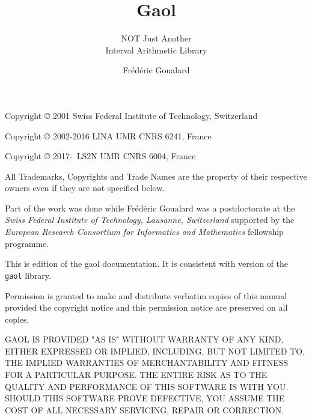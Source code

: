 \documentclass{manual}
\title{Gaol \version}
\subtitle{NOT Just Another \\Interval Arithmetic Library}
\author{Fr\'ed\'eric Goualard}
\institute{Laboratoire d'Informatique de Nantes-Atlantique, France}
\begin{document}
\maketitle

\begin{copyrighttxt}
Copyright \copyright{} 2001 Swiss Federal Institute of Technology, Switzerland

Copyright \copyright{} 2002-2016 LINA UMR CNRS 6241, France

Copyright \copyright{} 2017-\number\year\ LS2N UMR CNRS 6004, France

All Trademarks, Copyrights and Trade Names are the property of their respective owners
even if they are not specified below.

Part of the work was done while Fr\'ed\'eric Goualard was a postdoctorate
at the \emph{Swiss Federal Institute of Technology, Lausanne, Switzerland}
supported by the \emph{European Research Consortium for Informatics and
Mathematics} fellowship programme.

This is edition \edition{} of the gaol documentation.
It is consistent with version \version{} of the \texttt{gaol} library.

Permission is granted to make and distribute verbatim copies of this manual
provided the copyright notice and this permission notice are preserved on all
copies.

\smallskip
GAOL IS PROVIDED "AS IS" WITHOUT WARRANTY OF ANY
KIND, EITHER EXPRESSED OR IMPLIED, INCLUDING, BUT NOT LIMITED TO, THE
IMPLIED WARRANTIES OF MERCHAN\-TA\-BILITY AND FITNESS FOR A PARTICULAR
PURPOSE.  THE ENTIRE RISK AS TO THE QUALITY AND PERFORMANCE OF THIS
SOFTWARE IS WITH YOU.  SHOULD THIS SOFTWARE PRO\-VE DEFECTIVE, YOU ASSUME
THE COST OF ALL NECESSARY SERVICING, REPAIR OR CORRECTION.
\end{copyrighttxt}

\newpage
\thispagestyle{empty}

\vspace*{7cm}
\end{document}
